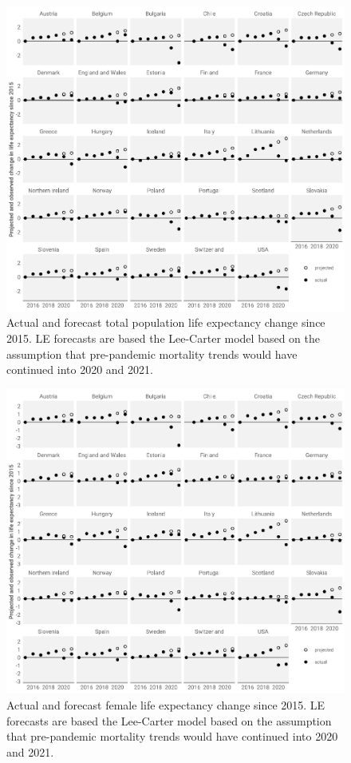\documentclass[12pt]{article}
\begin{document}
\begin{figure}[ht!]
    \centering
    \includegraphics{figure-a1.pdf}
    \caption{Actual and forecast total population life expectancy change since 2015. LE forecasts are based the Lee-Carter model based on the assumption that pre-pandemic mortality trends would have continued into 2020 and 2021.}
    \label{fig:figure-a1}
\end{figure}

\begin{figure}[ht!]
    \centering
    \includegraphics{figure-a2.pdf}
    \caption{Actual and forecast female life expectancy change since 2015. LE forecasts are based the Lee-Carter model based on the assumption that pre-pandemic mortality trends would have continued into 2020 and 2021.}
    \label{fig:figure-a2}
\end{figure}
\end{document}
